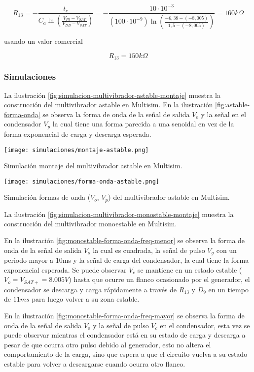\[
R_{13} = - \frac{t_c}{C_a \ln \left( \frac{V_{P3} - V_{SAT}}{V_{DB} - V_{SAT}} \right)} = - \frac{10 \cdot 10^{-3}}{(100 \cdot 10^{-9}) \ln \left( \frac{-6,38 - (-8,005)}{1,5 - (-8,005)} \right)} = 160k\Omega
\]

usando un valor comercial

$$R_{13} = 150k\Omega$$

\subsubsection{Simulaciones}

La ilustración \ref{fig:simulacion-multivibrador-astable-montaje} muestra la construcción del multivibrador astable en Multisim. En la ilustración \ref{fig:astable-forma-onda} se observa la forma de onda de la señal de salida $V_o$ y la señal en el condensador $V_p$ la cual tiene una forma parecida a una senoidal en vez de la forma exponencial de carga y descarga esperada.


\begin{ilustracion}[ht]
    \centering
    \texttt{[image: simulaciones/montaje-astable.png]}
    \caption{Simulación montaje del multivibrador astable en Multisim.}
    \label{fig:simulacion-multivibrador-astable-montaje}
\end{ilustracion}

\begin{ilustracion}[ht]
    \centering
    \texttt{[image: simulaciones/forma-onda-astable.png]}
    \caption{Simulación formas de onda ($V_o$, $V_p$) del multivibrador astable en Multisim.}
    \label{fig:astable-forma-onda}
\end{ilustracion}

La ilustración \ref{fig:simulacion-multivibrador-monostable-montaje} muestra la construcción del multivibrador monoestable en Multisim.

En la ilustración \ref{fig:monostable-forma-onda-freq-menor} se observa la forma de onda de la señal de salida $V_o$ la cual es cuadrada, la señal de pulso $V_g$ con un periodo mayor a 10ms y la señal de carga del condensador, la cual tiene la forma exponencial esperada. Se puede observar $V_c$ se mantiene en un estado estable ($V_o = V_{SAT+} =  8.005V$) hasta que ocurre un flanco ocasionado por el generador, el condensador se descarga y carga rápidamente a través de $R_{13}$ y $D_9$ en un tiempo de $11ms$ para luego volver a su zona estable.

En la ilustración \ref{fig:monostable-forma-onda-freq-mayor} se observa la forma de onda de la señal de salida $V_o$ y la señal de pulso $V_c$ en el condensador, esta vez se puede observar mientras el condensador está en su estado de carga y descarga a pesar de que ocurra otro pulso debido al generador, esto no altera el comportamiento de la carga, sino que espera a que el circuito vuelva a su estado estable para volver a descargarse cuando ocurra otro flanco.


